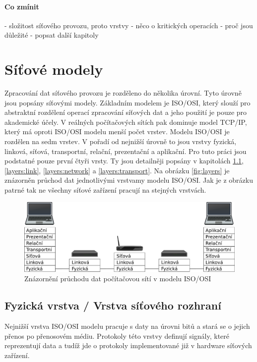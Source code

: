 \paragraph{Co zmínit}
- složitost síťového provozu, proto vrstvy
- něco o kritických operacích
- proč jsou důležité
- popsat další kapitoly

\section{Síťové modely}
Zpracování dat síťového provozu je rozděleno do několika úrovní. Tyto úrovně jsou popsány síťovými modely.
Základním modelem je ISO/OSI, který slouží pro abstraktní rozdělení operací zpracování síťových dat a jeho použití je
pouze pro akademické účely. V reálných počítačových sítích pak dominuje model TCP/IP, který má oproti
ISO/OSI modelu menší počet vrstev. Modelu ISO/OSI je rozdělen na sedm vrstev. V pořadí od nejnižší úrovně to
jsou vrstvy fyzická, linková, síťová, transportní, relační, prezentační a aplikační. Pro tuto práci jsou
podstatné pouze první čtyři vrsty. Ty jsou detailněji popsány v kapitolách \ref{layers:physical},
\ref{layers:link}, \ref{layers:network} a \ref{layers:transport}. Na obrázku \ref{fig:layers} je
znázorněn průchod dat jednotlivými vrstvamy modelu ISO/OSI. Jak je z obrázku patrné tak ne všechny síťové
zařízení pracují na stejných vrstvách.

\begin{figure}[!htbp]
	\centering
	\includegraphics[scale=.25]{fig/layers.pdf}
	\caption{Znázornění průchodu dat počítačovou sítí v modelu ISO/OSI}
\end{figure}\label{fig:layers}

\subsection{Fyzická vrstva / Vrstva síťového rozhraní}\label{layers:physical}
Nejnižší vrstva ISO/OSI modelu pracuje s daty na úrovni bitů a stará se o
jejich přenos po přenosovém médiu. Protokoly této vrstvy definují signály, které reprezentují data
a tudíž jde o protokoly implementované již v hardware síťových zařízení.

